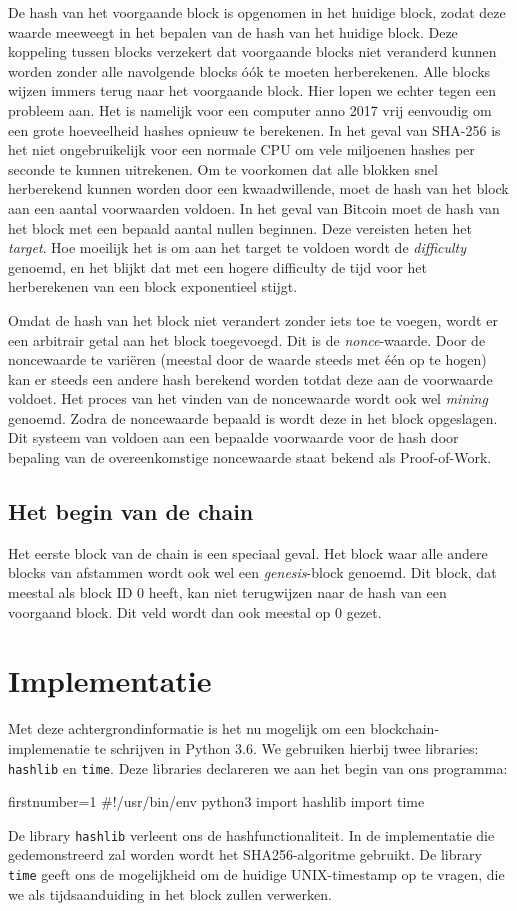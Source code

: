 \documentclass{article}
\begin{document}
De hash van het voorgaande block is opgenomen in het huidige block, zodat deze waarde meeweegt in het bepalen van de hash van het huidige block. Deze koppeling tussen blocks verzekert dat voorgaande blocks niet veranderd kunnen worden zonder alle navolgende blocks óók te moeten herberekenen. Alle blocks wijzen immers terug naar het voorgaande block. Hier lopen we echter tegen een probleem aan. Het is namelijk voor een computer anno 2017 vrij eenvoudig om een grote hoeveelheid hashes opnieuw te berekenen. In het geval van SHA-256 is het niet ongebruikelijk voor een normale CPU om vele miljoenen hashes per seconde te kunnen uitrekenen. Om te voorkomen dat alle blokken snel herberekend kunnen worden door een kwaadwillende, moet de hash van het block aan een aantal voorwaarden voldoen. In het geval van Bitcoin moet de hash van het block met een bepaald aantal nullen beginnen. Deze vereisten heten het \textit{target}. Hoe moeilijk het is om aan het target te voldoen wordt de \textit{difficulty} genoemd, en het blijkt dat met een hogere difficulty de tijd voor het herberekenen van een block exponentieel stijgt.

Omdat de hash van het block niet verandert zonder iets toe te voegen, wordt er een arbitrair getal aan het block toegevoegd. Dit is de \textit{nonce}-waarde. Door de noncewaarde te variëren (meestal door de waarde steeds met één op te hogen) kan er steeds een andere hash berekend worden totdat deze aan de voorwaarde voldoet. Het proces van het vinden van de noncewaarde wordt ook wel \textit{mining} genoemd. Zodra de noncewaarde bepaald is wordt deze in het block opgeslagen. Dit systeem van voldoen aan een bepaalde voorwaarde voor de hash door bepaling van de overeenkomstige noncewaarde staat bekend als Proof-of-Work.

\subsection{Het begin van de chain}
Het eerste block van de chain is een speciaal geval. Het block waar alle andere blocks van afstammen wordt ook wel een \textit{genesis}-block genoemd. Dit block, dat meestal als block ID 0 heeft, kan niet terugwijzen naar de hash van een voorgaand block. Dit veld wordt dan ook meestal op 0 gezet.

\newpage
\section{Implementatie}
Met deze achtergrondinformatie is het nu mogelijk om een blockchain-implemenatie te schrijven in Python 3.6. We gebruiken hierbij twee libraries: \texttt{hashlib} en \texttt{time}. Deze libraries declareren we aan het begin van ons programma:
\begin{python3code*}{firstnumber=1}
#!/usr/bin/env python3
import hashlib
import time


\end{python3code*}
De library \texttt{hashlib} verleent ons de hashfunctionaliteit. In de implementatie die gedemonstreerd zal worden wordt het SHA256-algoritme gebruikt. De library \texttt{time} geeft ons de mogelijkheid om de huidige UNIX-timestamp op te vragen, die we als tijdsaanduiding in het block zullen verwerken.
\end{document}
